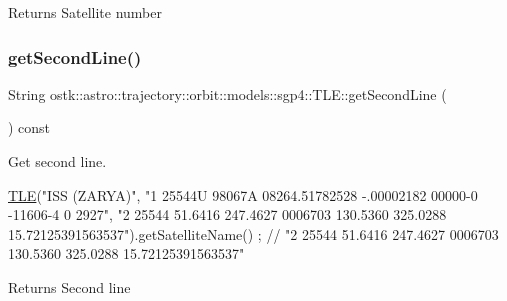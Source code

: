 \begin{DoxyReturn}{Returns}
Satellite number 
\end{DoxyReturn}
\mbox{\label{classostk_1_1astro_1_1trajectory_1_1orbit_1_1models_1_1sgp4_1_1_t_l_e_a6f1f60f662a1891ce93576344989502a}} 
\subsubsection{\texorpdfstring{get\+Second\+Line()}{getSecondLine()}}
{\footnotesize\ttfamily String ostk\+::astro\+::trajectory\+::orbit\+::models\+::sgp4\+::\+T\+L\+E\+::get\+Second\+Line (\begin{DoxyParamCaption}{ }\end{DoxyParamCaption}) const}



Get second line. 


\begin{DoxyCode}
\hyperlink{classostk_1_1astro_1_1trajectory_1_1orbit_1_1models_1_1sgp4_1_1_t_l_e_a57323db2c24577c2e8ddce79fa776d1e}{TLE}(\textcolor{stringliteral}{"ISS (ZARYA)"},
    \textcolor{stringliteral}{"1 25544U 98067A   08264.51782528 -.00002182  00000-0 -11606-4 0  2927"},
    \textcolor{stringliteral}{"2 25544  51.6416 247.4627 0006703 130.5360 325.0288 15.72125391563537"}).getSatelliteName() ; \textcolor{comment}{// "2
       25544  51.6416 247.4627 0006703 130.5360 325.0288 15.72125391563537"}
\end{DoxyCode}


\begin{DoxyReturn}{Returns}
Second line 
\end{DoxyReturn}
\mbox{\label{classostk_1_1astro_1_1trajectory_1_1orbit_1_1models_1_1sgp4_1_1_t_l_e_aa7fa1003a2b03fb7f3829bfdd342942f}} 
